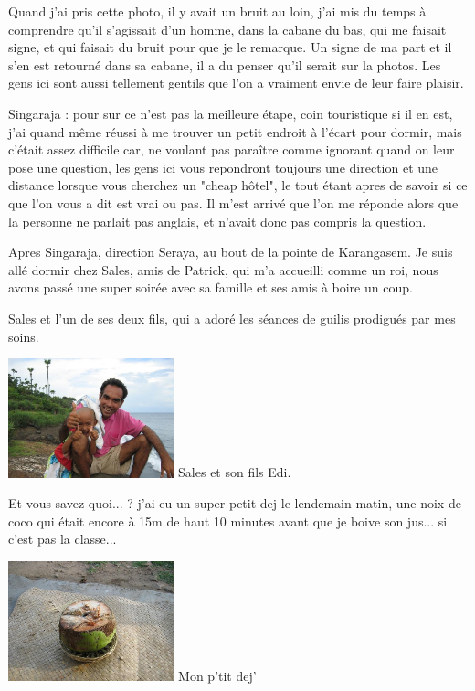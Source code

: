 \begin{multicols}{2}
Quand j'ai pris cette photo, il y avait un bruit au loin, j'ai mis du temps à comprendre qu'il s'agissait d'un homme, dans la cabane du bas, qui me faisait signe, et qui faisait du bruit pour que je le remarque. Un signe de ma part et il s'en est retourné dans sa cabane, il a du penser qu'il serait sur la photos. Les gens ici sont aussi tellement gentils que l'on a vraiment envie de leur faire plaisir.

Singaraja : pour sur ce n'est pas la meilleure étape, coin touristique si il en est, j'ai quand même réussi à me trouver un petit endroit à l'écart pour dormir, mais c'était assez difficile car, ne voulant pas paraître comme ignorant quand on leur pose une question, les gens ici vous repondront toujours une direction et une distance lorsque vous cherchez un "cheap hôtel", le tout étant apres de savoir si ce que l'on vous a dit est vrai ou pas. Il m'est arrivé que l'on me réponde alors que la personne ne parlait pas anglais, et n'avait donc pas compris la question.

Apres Singaraja, direction Seraya, au bout de la pointe de Karangasem. Je suis allé dormir chez Sales, amis de Patrick, qui m'a accueilli comme un roi, nous avons passé une super soirée avec sa famille et ses amis à boire un coup.

Sales et l'un de ses deux fils, qui a adoré les séances de guilis prodigués par mes soins.

\hspace*{-0.65cm}
\includegraphics[width=4.8cm]{articles/Round-trip-in-bali/1208257303gr5r.jpg}
Sales et son fils Edi.

Et vous savez quoi... ? j'ai eu un super petit dej le lendemain matin, une noix de coco qui était encore à 15m de haut 10 minutes avant que je boive son jus... si c'est pas la classe...

\hspace*{-0.65cm}
\includegraphics[width=4.8cm]{articles/Round-trip-in-bali/1208257299a93l.jpg}
Mon p'tit dej'



\end{multicols}
